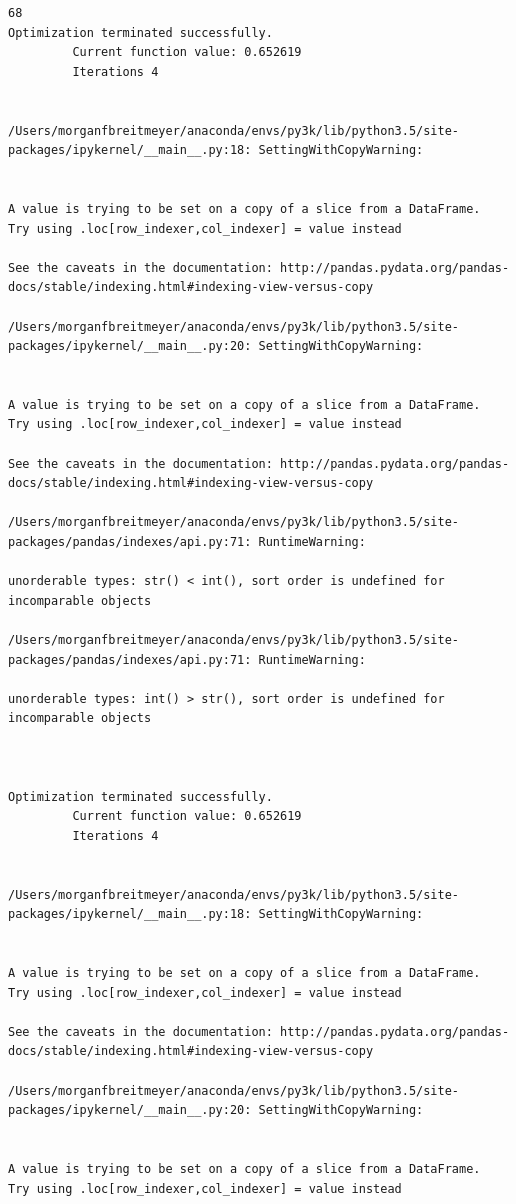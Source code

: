 \begin{lstlisting}
68
Optimization terminated successfully.
         Current function value: 0.652619
         Iterations 4


/Users/morganfbreitmeyer/anaconda/envs/py3k/lib/python3.5/site-packages/ipykernel/__main__.py:18: SettingWithCopyWarning:


A value is trying to be set on a copy of a slice from a DataFrame.
Try using .loc[row_indexer,col_indexer] = value instead

See the caveats in the documentation: http://pandas.pydata.org/pandas-docs/stable/indexing.html#indexing-view-versus-copy

/Users/morganfbreitmeyer/anaconda/envs/py3k/lib/python3.5/site-packages/ipykernel/__main__.py:20: SettingWithCopyWarning:


A value is trying to be set on a copy of a slice from a DataFrame.
Try using .loc[row_indexer,col_indexer] = value instead

See the caveats in the documentation: http://pandas.pydata.org/pandas-docs/stable/indexing.html#indexing-view-versus-copy

/Users/morganfbreitmeyer/anaconda/envs/py3k/lib/python3.5/site-packages/pandas/indexes/api.py:71: RuntimeWarning:

unorderable types: str() < int(), sort order is undefined for incomparable objects

/Users/morganfbreitmeyer/anaconda/envs/py3k/lib/python3.5/site-packages/pandas/indexes/api.py:71: RuntimeWarning:

unorderable types: int() > str(), sort order is undefined for incomparable objects



Optimization terminated successfully.
         Current function value: 0.652619
         Iterations 4


/Users/morganfbreitmeyer/anaconda/envs/py3k/lib/python3.5/site-packages/ipykernel/__main__.py:18: SettingWithCopyWarning:


A value is trying to be set on a copy of a slice from a DataFrame.
Try using .loc[row_indexer,col_indexer] = value instead

See the caveats in the documentation: http://pandas.pydata.org/pandas-docs/stable/indexing.html#indexing-view-versus-copy

/Users/morganfbreitmeyer/anaconda/envs/py3k/lib/python3.5/site-packages/ipykernel/__main__.py:20: SettingWithCopyWarning:


A value is trying to be set on a copy of a slice from a DataFrame.
Try using .loc[row_indexer,col_indexer] = value instead


\end{lstlisting}
